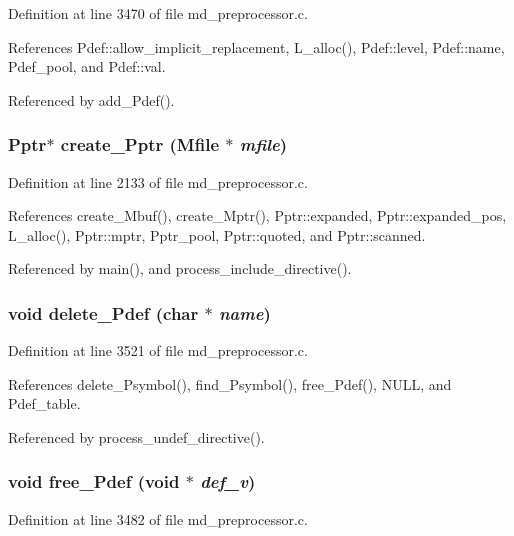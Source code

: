 Definition at line 3470 of file md\_\-preprocessor.c.

References Pdef::allow\_\-implicit\_\-replacement, L\_\-alloc(), Pdef::level, Pdef::name, Pdef\_\-pool, and Pdef::val.

Referenced by add\_\-Pdef().
\subsubsection{\setlength{\rightskip}{0pt plus 5cm}\bf{Pptr}$\ast$ create\_\-Pptr (\bf{Mfile} $\ast$ {\em mfile})}\label{md__preprocessor_8c_03c35a85124487f604fced1fd4cb1413}




Definition at line 2133 of file md\_\-preprocessor.c.

References create\_\-Mbuf(), create\_\-Mptr(), Pptr::expanded, Pptr::expanded\_\-pos, L\_\-alloc(), Pptr::mptr, Pptr\_\-pool, Pptr::quoted, and Pptr::scanned.

Referenced by main(), and process\_\-include\_\-directive().
\subsubsection{\setlength{\rightskip}{0pt plus 5cm}void delete\_\-Pdef (char $\ast$ {\em name})}\label{md__preprocessor_8c_3cde2100eec552f5ae6db0940aef4d34}




Definition at line 3521 of file md\_\-preprocessor.c.

References delete\_\-Psymbol(), find\_\-Psymbol(), free\_\-Pdef(), NULL, and Pdef\_\-table.

Referenced by process\_\-undef\_\-directive().
\subsubsection{\setlength{\rightskip}{0pt plus 5cm}void free\_\-Pdef (void $\ast$ {\em def\_\-v})}\label{md__preprocessor_8c_89ffda2e246f0a64495be522f05cbadd}




Definition at line 3482 of file md\_\-preprocessor.c.

